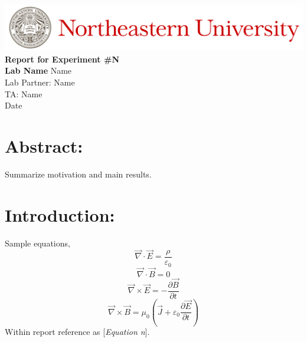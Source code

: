 \documentclass[12pt,a4paper]{article}
\begin{document}
\begin{center}
	\includegraphics[width=\textwidth]{./Images/Header.jpeg}
	\vfill		
	\textbf{\Large{Report for Experiment \#N\\
	Lab Name}}
	\vfill
	Name\\
	Lab Partner: Name\\
	TA: Name\\
	Date
	\vfill
\end{center}
	
\section*{Abstract:}
	Summarize motivation and main results.
	
\newpage
	
\section*{Introduction:}
	Sample equations,
	\[ \vec{\nabla} \cdot \vec{E} = \frac{\rho}{\varepsilon_0} \tag{1} \]
	\[ \vec{\nabla} \cdot \vec{B} = 0 \tag{2} \]
	\[ \vec{\nabla} \times \vec{E} = - \frac{\partial \vec{B}}{\partial t} \tag{3} \]
	\[ \vec{\nabla} \times \vec{B} = \mu_0 \left( \vec{J} + \varepsilon_0 \frac{\partial \vec{E}}{\partial t} \right) \tag{4} \]
	Within report reference as [\textit{Equation n}].
\end{document}
